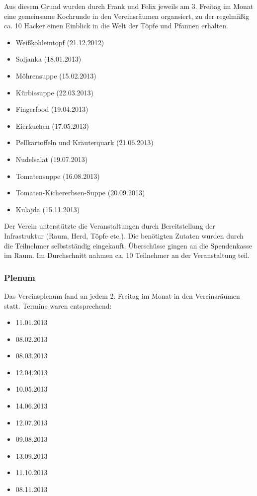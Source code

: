 \documentclass[10pt,DIV16]{scrartcl}
\begin{document}
Aus diesem Grund wurden durch Frank und Felix jeweils am 3. Freitag
im Monat eine gemeinsame Kochrunde in den Vereinsräumen organsiert,
zu der regelmäßig ca. 10 Hacker einen Einblick in die Welt der Töpfe
und Pfannen erhalten.

\begin{itemize}
	\item Weißkohleintopf (21.12.2012)
	\item Soljanka (18.01.2013)
	\item Möhrensuppe (15.02.2013)
	\item Kürbissuppe (22.03.2013)
	\item Fingerfood (19.04.2013)
	\item Eierkuchen (17.05.2013)
	\item Pellkartoffeln und Kräuterquark (21.06.2013)
	\item Nudelsalat (19.07.2013)
	\item Tomatensuppe (16.08.2013)
	\item Tomaten-Kichererbsen-Suppe (20.09.2013)
	\item Kulajda (15.11.2013)
\end{itemize}

Der Verein unterstützte die Veranstaltungen durch Bereitstellung der
Infrastruktur (Raum, Herd, Töpfe etc.). Die benötigten Zutaten wurden
durch die Teilnehmer selbstständig eingekauft. Überschüsse gingen an
die Spendenkasse im Raum. Im Durchschnitt nahmen ca. 10 Teilnehmer an
der Veranstaltung teil.

\subsubsection{Plenum}

Das Vereinsplenum fand an jedem 2. Freitag im Monat in den
Vereinsräumen statt. Termine waren entsprechend:

\begin{itemize}
	\item 11.01.2013
	\item 08.02.2013
	\item 08.03.2013
	\item 12.04.2013
	\item 10.05.2013
	\item 14.06.2013
	\item 12.07.2013
	\item 09.08.2013
	\item 13.09.2013
	\item 11.10.2013
	\item 08.11.2013
\end{itemize}
\end{document}
